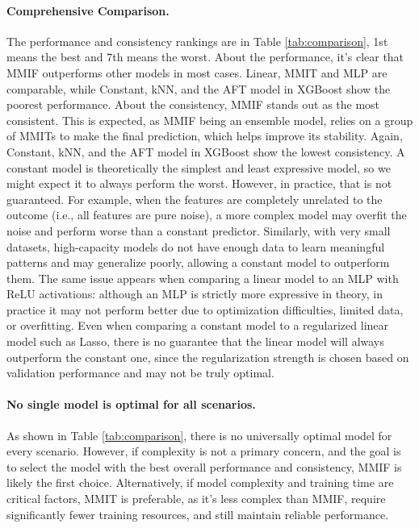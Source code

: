 \documentclass[12pt]{article}
\begin{document}
\paragraph{Comprehensive Comparison.}
The performance and consistency rankings are in Table \ref{tab:comparison}, 1st means the best and 7th means the worst. 
About the performance, it's clear that MMIF outperforms other models in most cases. 
Linear, MMIT and MLP are comparable, while Constant, kNN, and the AFT model in XGBoost show the poorest performance.
About the consistency, MMIF stands out as the most consistent. 
This is expected, as MMIF being an ensemble model, relies on a group of MMITs to make the final prediction, which helps improve its stability.
Again, Constant, kNN, and the AFT model in XGBoost show the lowest consistency.
A constant model is theoretically the simplest and least expressive model, so we might expect it to always perform the worst. 
However, in practice, that is not guaranteed. 
For example, when the features are completely unrelated to the outcome (i.e., all features are pure noise), a more complex model may overfit the noise and perform worse than a constant predictor. 
Similarly, with very small datasets, high-capacity models do not have enough data to learn meaningful patterns and may generalize poorly, allowing a constant model to outperform them. 
The same issue appears when comparing a linear model to an MLP with ReLU activations: although an MLP is strictly more expressive in theory, in practice it may not perform better due to optimization difficulties, limited data, or overfitting. 
Even when comparing a constant model to a regularized linear model such as Lasso, there is no guarantee that the linear model will always outperform the constant one, since the regularization strength is chosen based on validation performance and may not be truly optimal.

\paragraph{No single model is optimal for all scenarios.}  
As shown in Table \ref{tab:comparison}, there is no universally optimal model for every scenario.
However, if complexity is not a primary concern, and the goal is to select the model with the best overall performance and consistency, MMIF is likely the first choice.  
Alternatively, if model complexity and training time are critical factors, MMIT is preferable, as it's less complex than MMIF, require significantly fewer training resources, and still maintain reliable performance.
\end{document}
